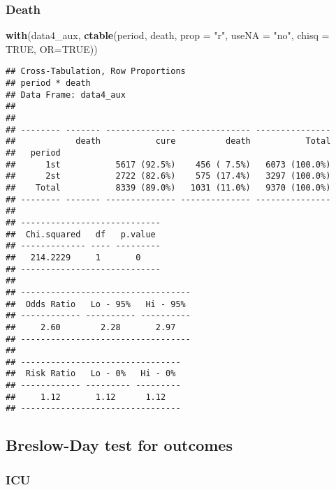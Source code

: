 \documentclass[
]{article}
\newenvironment{Shaded}{\begin{snugshade}}{\end{snugshade}}
\newcommand{\DataTypeTok}[1]{\textcolor[rgb]{0.13,0.29,0.53}{#1}}
\newcommand{\KeywordTok}[1]{\textcolor[rgb]{0.13,0.29,0.53}{\textbf{#1}}}
\newcommand{\NormalTok}[1]{#1}
\newcommand{\OtherTok}[1]{\textcolor[rgb]{0.56,0.35,0.01}{#1}}
\newcommand{\StringTok}[1]{\textcolor[rgb]{0.31,0.60,0.02}{#1}}
\begin{document}
\hypertarget{death-2}{%
\subsubsection{Death}\label{death-2}}

\begin{Shaded}
\begin{Highlighting}[]
\KeywordTok{with}\NormalTok{(data4_aux, }\KeywordTok{ctable}\NormalTok{(period, death, }\DataTypeTok{prop =} \StringTok{"r"}\NormalTok{, }\DataTypeTok{useNA =} \StringTok{"no"}\NormalTok{, }\DataTypeTok{chisq =} \OtherTok{TRUE}\NormalTok{, }\DataTypeTok{OR=}\OtherTok{TRUE}\NormalTok{))}
\end{Highlighting}
\end{Shaded}

\begin{verbatim}
## Cross-Tabulation, Row Proportions  
## period * death  
## Data Frame: data4_aux  
## 
## 
## -------- ------- -------------- -------------- ---------------
##            death           cure          death           Total
##   period                                                      
##      1st           5617 (92.5%)    456 ( 7.5%)   6073 (100.0%)
##      2st           2722 (82.6%)    575 (17.4%)   3297 (100.0%)
##    Total           8339 (89.0%)   1031 (11.0%)   9370 (100.0%)
## -------- ------- -------------- -------------- ---------------
## 
## ----------------------------
##  Chi.squared   df   p.value 
## ------------- ---- ---------
##   214.2229     1       0    
## ----------------------------
## 
## ----------------------------------
##  Odds Ratio   Lo - 95%   Hi - 95% 
## ------------ ---------- ----------
##     2.60        2.28       2.97   
## ----------------------------------
## 
## --------------------------------
##  Risk Ratio   Lo - 0%   Hi - 0% 
## ------------ --------- ---------
##     1.12       1.12      1.12   
## --------------------------------
\end{verbatim}

\hypertarget{breslow-day-test-for-outcomes}{%
\subsection{Breslow-Day test for
outcomes}\label{breslow-day-test-for-outcomes}}

\hypertarget{icu-3}{%
\subsubsection{ICU}\label{icu-3}}
\end{document}

